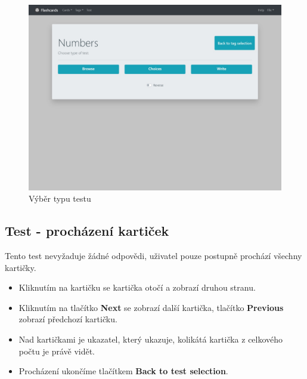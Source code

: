 \documentclass[11pt]{article}
\providecommand{\tightlist}{\setlength{\itemsep}{1pt}\setlength{\parskip}{1pt}}
\begin{document}
\begin{figure}
\centering
\includegraphics{assets/test_type.jpg}
\caption{Výběr typu testu}
\end{figure}

\hypertarget{test---prochuxe1zenuxed-kartiux10dek}{%
\subsection{Test - procházení
kartiček}\label{test---prochuxe1zenuxed-kartiux10dek}}

Tento test nevyžaduje žádné odpovědi, uživatel pouze postupně prochází
všechny kartičky.

\begin{itemize}
\tightlist
\item
  Kliknutím na kartičku se kartička otočí a zobrazí druhou stranu.
\item
  Kliknutím na tlačítko \textbf{Next} se zobrazí další kartička,
  tlačítko \textbf{Previous} zobrazí předchozí kartičku.
\item
  Nad kartičkami je ukazatel, který ukazuje, kolikátá kartička z
  celkového počtu je právě vidět.
\item
  Procházení ukončíme tlačítkem \textbf{Back to test selection}.
\end{itemize}
\end{document}
